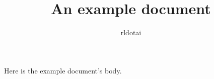 

\title{An example document}
\author{rldotai}



\maketitle
\tableofcontents

Here is the example document's body.

